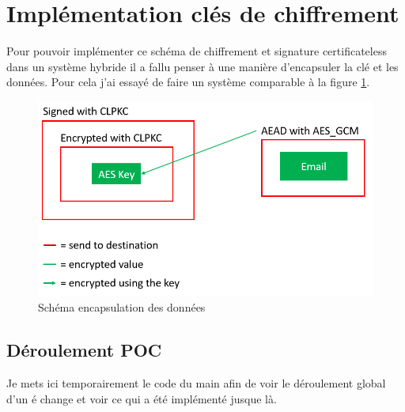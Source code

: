 \section{Implémentation clés  de chiffrement}
Pour pouvoir implémenter ce schéma de chiffrement et signature certificateless dans un système hybride il a fallu penser à une manière d'encapsuler la clé et les données. Pour cela j'ai essayé de faire un système comparable à la figure \ref{fig:encapsulate}. 
\begin{figure}[h!]
	\centering
	\includegraphics[width=12cm]{images/schemaEncapsulation.png}
	\caption{Schéma encapsulation des données}
	\label{fig:encapsulate}
\end{figure}

\subsection{Déroulement POC}
Je mets ici temporairement le code du main afin de voir le déroulement global d'un é change et voir ce qui a été implémenté jusque là.

